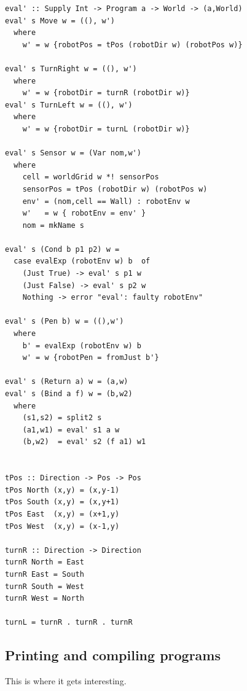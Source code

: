 \begin{small}
\begin{verbatim}
eval' :: Supply Int -> Program a -> World -> (a,World)  
eval' s Move w = ((), w')
  where
    w' = w {robotPos = tPos (robotDir w) (robotPos w)}

eval' s TurnRight w = ((), w')
  where
    w' = w {robotDir = turnR (robotDir w)}
eval' s TurnLeft w = ((), w')
  where
    w' = w {robotDir = turnL (robotDir w)}
    
eval' s Sensor w = (Var nom,w') 
  where
    cell = worldGrid w *! sensorPos 
    sensorPos = tPos (robotDir w) (robotPos w)
    env' = (nom,cell == Wall) : robotEnv w
    w'   = w { robotEnv = env' } 
    nom = mkName s
    
eval' s (Cond b p1 p2) w =
  case evalExp (robotEnv w) b  of
    (Just True) -> eval' s p1 w
    (Just False) -> eval' s p2 w
    Nothing -> error "eval': faulty robotEnv" 
    
eval' s (Pen b) w = ((),w') 
  where
    b' = evalExp (robotEnv w) b 
    w' = w {robotPen = fromJust b'}
    
eval' s (Return a) w = (a,w)
eval' s (Bind a f) w = (b,w2) 
  where
    (s1,s2) = split2 s
    (a1,w1) = eval' s1 a w
    (b,w2)  = eval' s2 (f a1) w1

 
tPos :: Direction -> Pos -> Pos    
tPos North (x,y) = (x,y-1)
tPos South (x,y) = (x,y+1)
tPos East  (x,y) = (x+1,y)
tPos West  (x,y) = (x-1,y)

turnR :: Direction -> Direction 
turnR North = East
turnR East = South
turnR South = West
turnR West = North

turnL = turnR . turnR . turnR   
\end{verbatim}
\end{small}

\subsection{Printing and compiling programs} 
This is where it gets interesting. 

